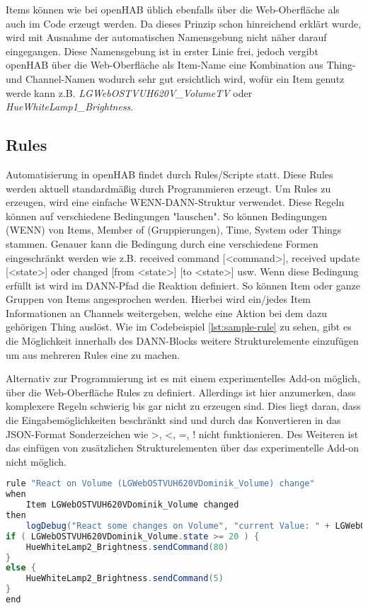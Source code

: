Items können wie bei openHAB üblich ebenfalls über die Web-Oberfläche als auch im Code erzeugt werden. Da dieses Prinzip schon hinreichend erklärt wurde, wird mit Ausnahme der automatischen Namensgebung nicht näher darauf eingegangen. Diese Namensgebung ist in erster Linie frei, jedoch vergibt openHAB über die Web-Oberfläche als Item-Name eine Kombination aus Thing- und Channel-Namen wodurch sehr gut ersichtlich wird, wofür ein Item genutz werde kann z.B. \textit{LGWebOSTVUH620V\_VolumeTV} oder \textit{HueWhiteLamp1\_Brightness}.

\subsection{Rules}
Automatisierung in openHAB findet durch Rules/Scripte statt. Diese Rules werden aktuell standardmäßig durch Programmieren erzeugt. Um Rules zu erzeugen, wird eine einfache WENN-DANN-Struktur verwendet. Diese Regeln können auf verschiedene Bedingungen "lauschen". So können Bedingungen (WENN) von Items, Member of (Gruppierungen), Time, System oder Things stammen. Genauer kann die Bedingung durch eine verschiedene Formen eingeschränkt werden wie z.B. received command [<command>],  received update [<state>] oder changed [from <state>] [to <state>] usw.
Wenn diese Bedingung erfüllt ist wird im DANN-Pfad die Reaktion definiert. So können Item oder ganze Gruppen von Items angesprochen werden. Hierbei wird ein/jedes Item Informationen an Channels weitergeben, welche eine Aktion bei dem dazu gehörigen Thing auslöst.
Wie im Codebeispiel \ref{lst:sample-rule} zu sehen, gibt es die Möglichkeit innerhalb des DANN-Blocks weitere Strukturelemente einzufügen um aus mehreren Rules eine zu machen.

Alternativ zur Programmierung ist es mit einem experimentelles Add-on möglich, über die Web-Oberfläche Rules zu definiert. Allerdings ist hier anzumerken, dass komplexere Regeln schwierig bis gar nicht zu erzeugen sind. Dies liegt daran, dass die Eingabemöglichkeiten beschränkt sind und durch das Konvertieren in das JSON-Format Sonderzeichen wie >, <, =, ! nicht funktionieren. Des Weiteren ist das einfügen von zusätzlichen Strukturelementen über das experimentelle Add-on nicht möglich.

\begin{lstlisting}[language=java,firstnumber=1,caption=Rule Beispiel,label=lst:sample-rule]
rule "React on Volume (LGWebOSTVUH620VDominik_Volume) change"
when
	Item LGWebOSTVUH620VDominik_Volume changed
then
	logDebug("React some changes on Volume", "current Value: " + LGWebOSTVUH620VDominik_Volume.state.toString)
if ( LGWebOSTVUH620VDominik_Volume.state >= 20 ) {
	HueWhiteLamp2_Brightness.sendCommand(80)
}
else {
	HueWhiteLamp2_Brightness.sendCommand(5)
}
end
\end{lstlisting}


